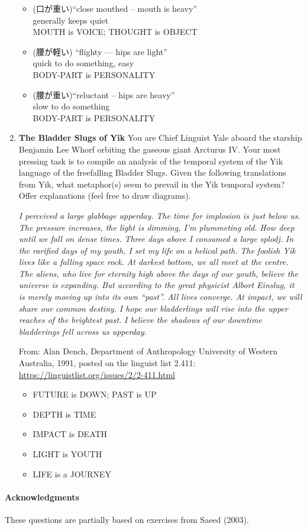 \documentclass[a4paper]{article}
\begin{document}
\begin{enumerate}
\begin{itemize}
 \item {} (口が重い)``close mouthed --  mouth is
   heavy''
   \\ generally keeps quiet
   \\ MOUTH is VOICE; THOUGHT is OBJECT
  \item {} (腰が軽い) ``flighty --- hips are  light''
    \\ quick to do something, easy
    \\ BODY-PART is PERSONALITY
 \item {} (腰が重い)``reluctant --  hips are heavy''
   \\ slow to do something
   \\ BODY-PART is PERSONALITY
  \end{itemize}
  \newpage
\item \textbf{The Bladder Slugs of Yik}
  You are Chief Linguist Yale aboard the starship Benjamin Lee Whorf
  orbiting the gaseous giant Arcturus IV. Your most pressing task is
  to compile an analysis of the temporal system of the Yik language of
  the freefalling Bladder Slugs. Given the following translations from
  Yik, what metaphor(s) seem to prevail in the Yik temporal system?
  Offer explanations (feel free to draw diagrams).
  \begin{exe}
    \ex \textit{I perceived a large glabbage upperday.}
    \ex \textit{The time for implosion is just below us. }
    \ex \textit{The pressure increases, the light is dimming, I'm plummeting old.}
    \ex \textit{How deep until we fall on dense times.}
    \ex \textit{Three days above I consumed a large splodj.}
    \ex \textit{In the rarified days of my youth, I set my life on a helical path.}
    \ex \textit{The foolish Yik lives like a falling space rock.}
    \ex \textit{At darkest bottom, we all meet at the centre.}
    \ex \textit{The aliens, who live for eternity high above the days of our youth, believe the universe is expanding. But according to the great physicist Albort Einslug, it is merely moving up into its own ``past''.}
    \ex \textit{All lives converge. At impact, we will share our common destiny.}
    \ex \textit{I hope our bladderlings will rise into the upper reaches of the brightest past.}
    \ex \textit{I believe the shadows of our downtime bladderings fell across us upperday.}
  \end{exe}
From:  Alan Dench, Department of Anthropology University of Western
Australia, 1991, posted on the linguist list 2.411: \url{https://linguistlist.org/issues/2/2-411.html}

\begin{itemize}
\item FUTURE is DOWN; PAST is UP
\item DEPTH is TIME
\item IMPACT is DEATH
\item LIGHT is YOUTH
\item LIFE is a JOURNEY
\end{itemize}
\end{enumerate}

\vfill
\paragraph{Acknowledgments} These questions are partially
based on exercises from Saeed (2003).
\end{document}
